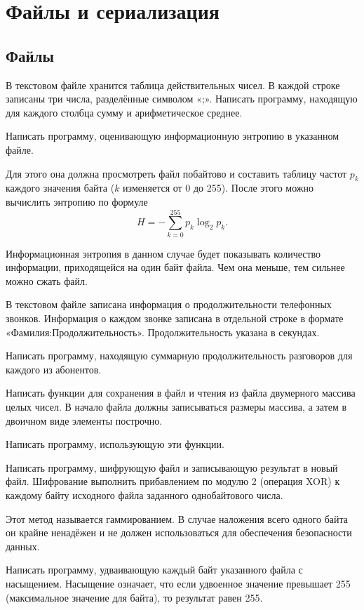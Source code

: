 \section{Файлы и сериализация}

\subsection{Файлы}

\task В текстовом файле хранится таблица действительных чисел. В
каждой строке записаны три числа, разделённые символом «;». Написать
программу, находящую для каждого столбца сумму и арифметическое
среднее.

\task Написать программу, оценивающую информационную энтропию в
указанном файле.

Для этого она должна просмотреть файл побайтово и составить таблицу
частот $p_k$ каждого значения байта ($k$ изменяется от 0 до
255). После этого можно вычислить энтропию по формуле
\[
H = - \sum_{k=0}^{255} p_k \log_2 p_k.
\]

Информационная энтропия в данном случае будет показывать количество
информации, приходящейся на один байт файла. Чем она меньше, тем
сильнее можно сжать файл.

\task В текстовом файле записана информация о продолжительности
телефонных звонков.  Информация о каждом звонке записана в отдельной
строке в формате «Фамилия:Продолжительность». Продолжительность
указана в секундах.

Написать программу, находящую суммарную продолжительность разговоров
для каждого из абонентов.

\task Написать функции для сохранения в файл и чтения из файла
двумерного массива целых чисел. В начало файла должны записываться
размеры массива, а затем в двоичном виде элементы построчно.

Написать программу, использующую эти функции.

\task Написать программу, шифрующую файл и записывающую результат в
новый файл. Шифрование выполнить прибавлением по модулю 2 (операция
XOR) к каждому байту исходного файла заданного однобайтового числа.

Этот метод называется гаммированием. В случае наложения всего одного
байта он крайне ненадёжен и не должен использоваться для обеспечения
безопасности данных.

\task Написать программу, удваивающую каждый байт указанного файла с
насыщением. Насыщение означает, что если удвоенное значение превышает
255 (максимальное значение для байта), то результат равен 255.

